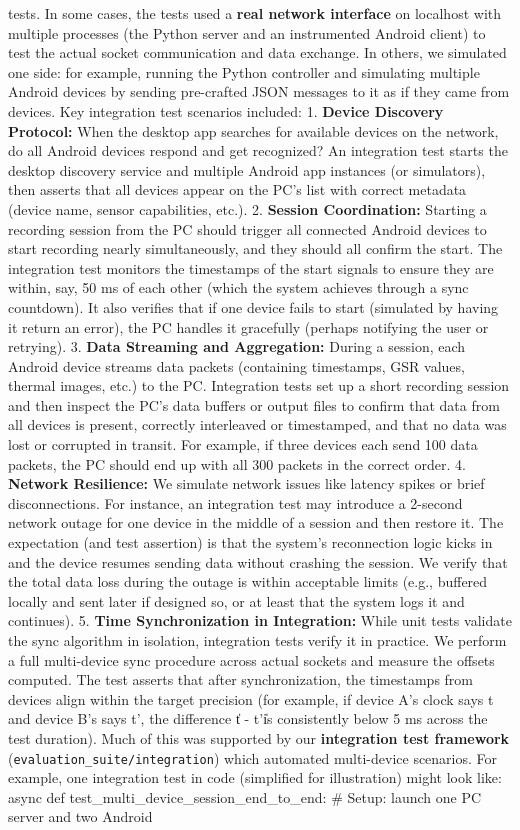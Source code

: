 tests. In some cases, the tests used a \textbf{real network interface} on localhost with multiple processes (the Python server and an instrumented Android client) to test the actual socket communication and data exchange. In others, we simulated one side: for example, running the Python controller and simulating multiple Android devices by sending pre-crafted JSON messages to it as if they came from devices. Key integration test scenarios included: 1. \textbf{Device Discovery Protocol:} When the desktop app searches for available devices on the network, do all Android devices respond and get recognized? An integration test starts the desktop discovery service and multiple Android app instances (or simulators), then asserts that all devices appear on the PC's list with correct metadata (device name, sensor capabilities, etc.). 2. \textbf{Session Coordination:} Starting a recording session from the PC should trigger all connected Android devices to start recording nearly simultaneously, and they should all confirm the start. The integration test monitors the timestamps of the start signals to ensure they are within, say, 50 ms of each other (which the system achieves through a sync countdown). It also verifies that if one device fails to start (simulated by having it return an error), the PC handles it gracefully (perhaps notifying the user or retrying). 3. \textbf{Data Streaming and Aggregation:} During a session, each Android device streams data packets (containing timestamps, GSR values, thermal images, etc.) to the PC. Integration tests set up a short recording session and then inspect the PC's data buffers or output files to confirm that data from all devices is present, correctly interleaved or timestamped, and that no data was lost or corrupted in transit. For example, if three devices each send 100 data packets, the PC should end up with all 300 packets in the correct order. 4. \textbf{Network Resilience:} We simulate network issues like latency spikes or brief disconnections. For instance, an integration test may introduce a 2-second network outage for one device in the middle of a session and then restore it. The expectation (and test assertion) is that the system's reconnection logic kicks in and the device resumes sending data without crashing the session. We verify that the total data loss during the outage is within acceptable limits (e.g., buffered locally and sent later if designed so, or at least that the system logs it and continues). 5. \textbf{Time Synchronization in Integration:} While unit tests validate the sync algorithm in isolation, integration tests verify it in practice. We perform a full multi-device sync procedure across actual sockets and measure the offsets computed. The test asserts that after synchronization, the timestamps from devices align within the target precision (for example, if device A's clock says t and device B's says t', the difference \|t - t'\| is consistently below 5 ms across the test duration). Much of this was supported by our \textbf{integration test framework} (\texttt{evaluation_suite/integration}) which automated multi-device scenarios. For example, one integration test in code (simplified for illustration) might look like: async def test_multi_device_session_end_to_end: # Setup: launch one PC server and two Android 